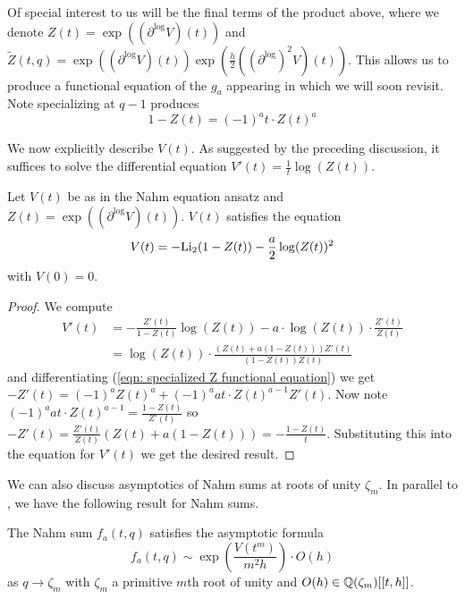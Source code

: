 Of special interest to us will be the final terms of the product above, where we denote $Z(t)=\exp((\partial^{\log}V)(t))$ and $\widetilde{Z}(t,q)=\exp\left((\partial^{\log}V)(t)\right)\exp\left(\frac{h}{2}((\partial^{\log})^{2}V)(t)\right)$.
This allows us to produce a functional equation of the $g_{a}$ appearing in  which we will soon revisit. Note specializing at $q-1$ produces 
\begin{equation}\label{eqn: specialized Z functional equation}
    1-Z(t)=(-1)^{a}t\cdot Z(t)^{a}
\end{equation}

We now explicitly describe $V(t)$. As suggested by the preceding discussion, it suffices to solve the differential equation $V'(t)=\frac{1}{t}\log(Z(t))$. 
\begin{proposition}\label{prop: V t dilogarithm equation}
    Let $V(t)$ be as in the Nahm equation ansatz and $Z(t)=\exp((\partial^{\log}V)(t))$. $V(t)$ satisfies the equation 
    \begin{equation}\label{eqn: V t dilogarithm equation}
        V(t) = -\mathrm{Li}_{2}(1-Z(t))-\frac{a}{2}\log(Z(t))^{2}
    \end{equation}
    with $V(0)=0$. 
\end{proposition}
\begin{proof}
    We compute 
    \begin{align*}
        V'(t) &= -\frac{Z'(t)}{1-Z(t)}\log(Z(t)) - a\cdot\log(Z(t))\cdot\frac{Z'(t)}{Z(t)} \\
        &= \log(Z(t))\cdot\frac{\left(Z(t)+a(1-Z(t))\right)Z'(t)}{(1-Z(t))Z(t)}
    \end{align*}
    and differentiating (\ref{eqn: specialized Z functional equation}) we get 
    $-Z'(t)=(-1)^{a}Z(t)^{a}+(-1)^{a}at\cdot Z(t)^{a-1}Z'(t)$. Now note $(-1)^{a}at\cdot Z(t)^{a-1}=\frac{1-Z(t)}{Z'(t)}$ so $-Z'(t)=\frac{Z'(t)}{Z(t)}\left(Z(t)+a(1-Z(t))\right)=-\frac{1-Z(t)}{t}$. Substituting this into the equation for $V'(t)$ we get the desired result. 
\end{proof}
We can also discuss asymptotics of Nahm sums at roots of unity $\zeta_{m}$. In parallel to , we have the following result for Nahm sums. 
\begin{theorem}\label{thm: Nahm sum asymptotics at roots of unity}
    The Nahm sum $f_{a}(t,q)$ satisfies the asymptotic formula 
    \begin{equation}\label{eqn: Nahm sum asymptotics at roots of unity}
        f_{a}(t,q)\sim\exp\left(\frac{V(t^{m})}{m^{2}h}\right)\cdot O(h)
    \end{equation}
    as $q\to\zeta_{m}$ with $\zeta_{m}$ a primitive $m$th root of unity and $O(h)\in\mathbb{Q}(\zeta_{m})[[t,h]]$. 
\end{theorem}
